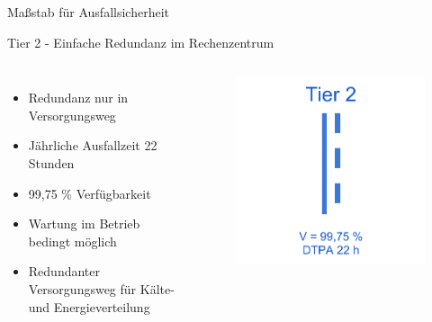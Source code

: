 \documentclass[10pt]{beamer}
\begin{document}
\begin{frame}[fragile]{Maßstab für Ausfallsicherheit}
\begin{alertblock}{Tier 2 - Einfache Redundanz im Rechenzentrum}
\end{alertblock}
\begin{columns}[T,c,onlytextwidth]
	\begin{itemize}
		\item Redundanz nur in Versorgungsweg
		\item Jährliche Ausfallzeit 22 Stunden
		\item 99,75 \% Verfügbarkeit
		\item Wartung im Betrieb bedingt möglich
		\item Redundanter Versorgungsweg für Kälte- und Energieverteilung
	\end{itemize}
	\begin{figure}
		\includegraphics[width=1\textwidth]{images/tier2}
	\end{figure}
\end{columns}
\end{frame}
\end{document}
